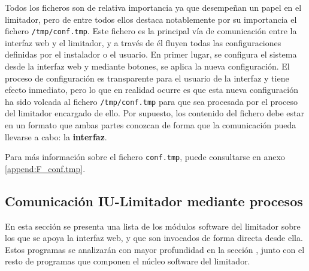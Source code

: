 Todos los ficheros son de relativa importancia ya que desempeñan un papel en el limitador, pero de entre todos ellos destaca notablemente por su importancia el fichero \verb|/tmp/conf.tmp|. Este fichero es la principal vía de comunicación entre la interfaz web y el limitador, y a través de él fluyen todas las configuraciones definidas por el instalador o el usuario. En primer lugar, se configura el sistema desde la interfaz web y mediante botones, se aplica la nueva configuración. El proceso de configuración es transparente para el usuario de la interfaz y tiene efecto inmediato, pero lo que en realidad ocurre es que esta nueva configuración ha sido volcada al fichero \verb|/tmp/conf.tmp| para que sea procesada por el proceso del limitador encargado de ello. Por supuesto, los contenido del fichero debe estar en un formato que ambas partes conozcan de forma que la comunicación pueda llevarse a cabo: la \textbf{interfaz}.

Para más información sobre el fichero \verb|conf.tmp|, puede consultarse en anexo \ref{append:F_conf.tmp}.

\subsection{Comunicación IU-Limitador mediante procesos} \label{sec:iu-limitador-procesos}

En esta sección se presenta una lista de los módulos software del limitador sobre los que se apoya la interfaz web, y que son invocados de forma directa desde ella. Estos programas se analizarán con mayor profundidad en la sección , junto con el resto de programas que componen el núcleo software del limitador.

